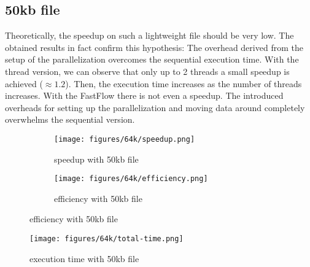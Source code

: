\documentclass{article}
\begin{document}
\subsection{50kb file}
Theoretically, the speedup on such a lightweight file should be very low.
The obtained results in fact confirm this hypothesis: The overhead derived
from the setup of the parallelization overcomes the sequential execution time.
With the thread version, we can observe that only up to 2 threads a small speedup is achieved ($\approx 1.2$).
Then, the execution time increases as the number of threads increases.
With the FastFlow there is not even a speedup. The introduced overheads
for setting up the parallelization and moving data around completely overwhelms the sequential version.
\begin{figure}[H]
    \begin{subfigure}{0.6\textwidth}
        \centering
        \texttt{[image: figures/64k/speedup.png]}
        \caption{speedup with 50kb file}
    \end{subfigure}
    \begin{subfigure}{0.6\textwidth}
        \centering
        \texttt{[image: figures/64k/efficiency.png]}
        \caption{efficiency with 50kb file}
    \end{subfigure}
\end{figure}
\begin{figure}[H]
        \centering
        \texttt{[image: figures/64k/total-time.png]}
        \caption{execution time with 50kb file}
\end{figure}
\end{document}
